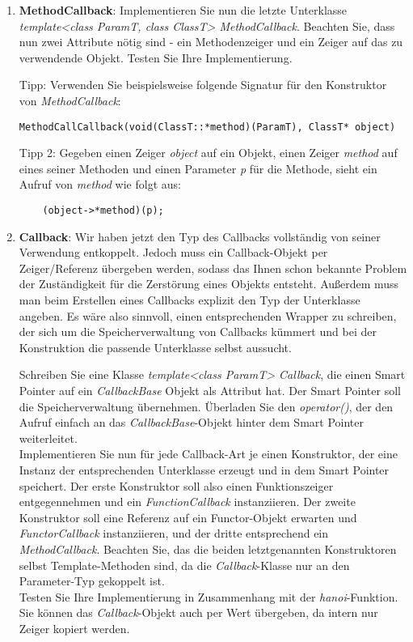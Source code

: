 \documentclass[
  accentcolor=tud1c,	%
  colorbacktitle,		%
  inverttitle,			%
  german,				%
  twoside
]{tudexercise}
\begin{document}
\begin{enumerate}
\item
\textbf{MethodCallback}:
Implementieren Sie nun die letzte Unterklasse \emph{template<class ParamT, class ClassT> MethodCallback}. Beachten Sie, dass nun zwei Attribute nötig sind - ein Methodenzeiger und ein Zeiger auf das zu verwendende Objekt. Testen Sie Ihre Implementierung.

Tipp: Verwenden Sie beispielsweise folgende Signatur für den Konstruktor von \emph{MethodCallback}:
\begin{lstlisting}
MethodCallCallback(void(ClassT::*method)(ParamT), ClassT* object)
\end{lstlisting}

Tipp 2: Gegeben einen Zeiger \emph{object} auf ein Objekt, einen Zeiger \emph{method} auf eines seiner Methoden und einen Parameter \emph{p} für die Methode, sieht ein Aufruf von \emph{method} wie folgt aus:
\begin{lstlisting}
	(object->*method)(p);
\end{lstlisting}

\item
\textbf{Callback}: 
Wir haben jetzt den Typ des Callbacks vollständig von seiner Verwendung entkoppelt. Jedoch muss ein Callback-Objekt per Zeiger/Referenz übergeben werden, sodass das Ihnen schon bekannte  Problem der Zuständigkeit für die Zerstörung eines Objekts entsteht. Außerdem muss man beim Erstellen eines Callbacks explizit den Typ der Unterklasse angeben. Es wäre also sinnvoll, einen entsprechenden Wrapper zu schreiben, der sich um die Speicherverwaltung von Callbacks kümmert und bei der Konstruktion  die passende Unterklasse selbst aussucht.

Schreiben Sie eine Klasse \emph{template<class ParamT> Callback}, die einen Smart Pointer auf ein \emph{CallbackBase} Objekt als Attribut hat. Der Smart Pointer soll die Speicherverwaltung übernehmen. Überladen Sie den \emph{operator()}, der den Aufruf einfach an das \emph{CallbackBase}-Objekt hinter dem Smart Pointer weiterleitet. \\

Implementieren Sie nun für jede Callback-Art je einen Konstruktor, der eine Instanz der entsprechenden Unterklasse erzeugt und in dem Smart Pointer speichert. Der erste Konstruktor soll also einen Funktionszeiger entgegennehmen und ein \emph{FunctionCallback} instanziieren. Der zweite Konstruktor soll eine Referenz auf ein Functor-Objekt erwarten und  \emph{FunctorCallback} instanziieren, und der dritte entsprechend ein \emph{MethodCallback}. Beachten Sie, das die beiden letztgenannten Konstruktoren selbst Template-Methoden sind, da die \emph{Callback}-Klasse nur an den Parameter-Typ gekoppelt ist.\\

Testen Sie Ihre Implementierung in Zusammenhang mit der \emph{hanoi}-Funktion. Sie können das \emph{Callback}-Objekt auch per Wert übergeben, da intern nur Zeiger kopiert werden. 

\end{enumerate}
\end{document}
